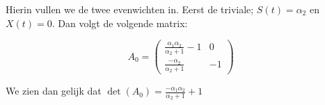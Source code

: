 Hierin vullen we de twee evenwichten in. Eerst de triviale; $S(t) = \alpha_2$ en $X(t) = 0$. Dan volgt de volgende matrix:

\begin{equation*}
	A_0 = 
	\begin{pmatrix}
		\frac{\alpha_1 \alpha_2}{\alpha_2 + 1} - 1 & 0 \\
		\frac{- \alpha_2}{\alpha_2 + 1} & -1 
	\end{pmatrix}
\end{equation*}

We zien dan gelijk dat $\det(A_0) = \frac{-\alpha_1\alpha_2}{\alpha_2 + 1} + 1$

